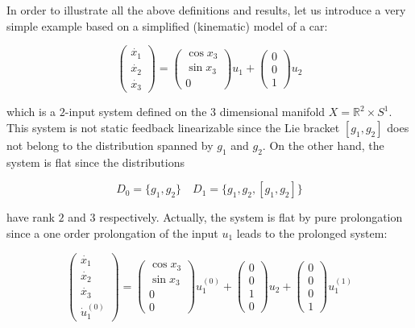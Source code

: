 \documentclass[10pt]{article}
\newcommand{\R}{\mathbb R}
\newcommand{\3}{\mathbf{3}}
\newcommand{\2}{\mathbf{2}}
\newcommand{\1}{\mathbf{1}}
\newcommand{\0}{\mathbf{0}}
\begin{document}
In order to illustrate all the above definitions and results, let us introduce a very simple example based on a simplified (kinematic) model of a car:


\begin{equation*}
    \begin{pmatrix} \dot{x_1} \\ \dot{x_2}  \\ \dot{x_3}   \end{pmatrix}
        =
    \begin{pmatrix} \cos x_3 \\ \sin x_3 \\ 0  \end{pmatrix}u_1
    +\begin{pmatrix} 0 \\  0 \\ 1  \end{pmatrix}u_2
\end{equation*}

which is a $2$-input system defined on the $3$ dimensional manifold $X=\R^{2}\times S^{1}$. This system is not static feedback linearizable since the Lie bracket $[g_1,g_2]$ does not belong to the distribution spanned by $g_1$ and $g_2$. On the other hand, the system is flat since the distributions

\[ D_0=\{ g_1,g_2 \} \quad D_1=\{ g_1,g_2,[g_1,g_2] \} \]

have rank $2$ and $3$ respectively. Actually, the system is flat by pure prolongation since a one order prolongation of the input $u_1$ leads to the prolonged system:


\begin{equation*}
   \begin{pmatrix} \dot{x_1} \\ \dot{x_2}  \\ \dot{x_3} \\ \dot{u}_1^{(0)}   \end{pmatrix}
        =
   \begin{pmatrix} \cos x_3 \\ \sin x_3 \\ 0 \\ 0 \end{pmatrix}u_1^{(0)}
    +\begin{pmatrix} 0 \\  0 \\ 1 \\ 0 \end{pmatrix}u_2 +  \begin{pmatrix} 0 \\  0 \\ 0 \\ 1 \end{pmatrix}u_1^{(1)}
\end{equation*}
\end{document}
